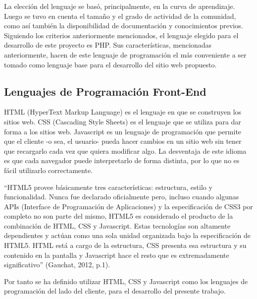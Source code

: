 \documentclass[11pt,oneside]{book}
\begin{document}
La elección del lenguaje se basó, principalmente, en la curva de aprendizaje. Luego se tuvo en cuenta el tamaño y el grado de actividad de la comunidad, como así también la disponibilidad de documentación y conocimientos previos. Siguiendo los criterios anteriormente mencionados, el lenguaje elegido para el desarrollo de este proyecto es PHP. Sus características, mencionadas anteriormente, hacen de este lenguaje de programación el más conveniente a ser tomado como lenguaje base para el desarrollo del sitio web propuesto.

\subsection{Lenguajes de Programación Front-End}
HTML (HyperText Markup Language) es el lenguaje en que se construyen los sitios web. %
CSS (Cascading Style Sheets) es el lenguaje que se utiliza para dar forma a los sitios web. %
Javascript es un lenguaje de programación que permite que el cliente -o sea, el usuario- pueda hacer cambios en un sitio web sin tener que recargarlo cada vez que quiera modificar algo. %
La desventaja de este idioma es que cada navegador puede interpretarlo de forma distinta, por lo que no es fácil utilizarlo correctamente.

``HTML5 provee básicamente tres características: estructura, estilo y funcionalidad. Nunca fue declarado oficialmente pero, incluso cuando algunas APIs (Interface de Programación de Aplicaciones) y la especificación de CSS3 por completo no son parte del mismo, HTML5 es considerado el producto de la combinación de HTML, CSS y Javascript. Estas tecnologías son altamente dependientes y actúan como una sola unidad organizada bajo la especificación de HTML5. HTML está a cargo de la estructura, CSS presenta esa estructura y su contenido en la pantalla y Javascript hace el resto que es extremadamente significativo'' (Gauchat, 2012, p.1).

Por tanto se ha definido utilizar HTML, CSS y Javascript como los lenguajes de programación del lado del cliente, para el desarrollo del presente trabajo.
\end{document}
